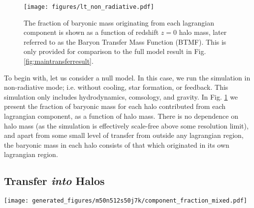 \begin{figure}
	\centering
	\texttt{[image: figures/lt\_non\_radiative.pdf]}
	\vspace{-0.7cm}
	\caption{
	The fraction of baryonic mass originating from each lagrangian component is
	shown as a function of redshift $z=0$ halo mass, later referred to as the
	Baryon Transfer Mass Function (BTMF). This is only provided for comparison to
	the full model result in Fig. \ref{fig:maintransferresult}.
	}
	\label{fig:nonradiativetransfer}
\end{figure}

To begin with, let us consider a null model. In this case, we run the simulation
in non-radiative mode; i.e. without cooling, star formation, or feedback. This
simulation only includes hydrodynamics, comsology, and gravity. In Fig.
\ref{fig:nonradiativetransfer} we present the fraction of baryonic mass for
each halo contributed from each lagrangian component, as a function of halo
mass. There is no dependence on halo mass (as the simulation is effectively
scale-free above some resolution limit), and apart from some small level of 
transfer from outside any lagrangian region, the baryonic mass in each halo
consists of that which originated in its own lagrangian region.

\subsection{Transfer \emph{into} Halos}

\begin{figure*}
	\centering
	\texttt{[image: generated\_figures/m50n512s50j7k/component\_fraction\_mixed.pdf]}
	\vspace{-0.7cm}
	\caption{
		The fraction of baryonic mass originating from each lagrangian component is
		shown as a function of redshift $z=0$ halo mass, later referred to as the
		Baryon Transfer Mass Function (BTMF). Different panels show different
		particle selections with all baryonic
		mass (left), gas mass (center), and stellar mass (right). Shaded
		regions show the $1\sigma$ scatter in a given bin, with one standard
		deviation of variation being shown. There is no attempt made to include
		halo assembly bias or the finite halo sampling in a $50\hmpc{}$ box in
		these regions.
	}
	\label{fig:maintransferresult}
\end{figure*}

